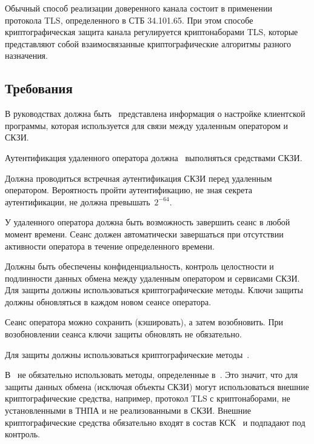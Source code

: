 Обычный способ реализации доверенного канала состоит в применении протокола 
TLS, определенного в СТБ 34.101.65. При этом способе криптографическая
защита канала регулируется криптонаборами TLS, которые представляют
собой взаимосвязанные криптографические алгоритмы разного назначения.

\subsection{Требования}\label{TC.Reqs}

\label{R.TC.GD}
В руководствах должна быть~
представлена информация о настройке клиентской программы, которая используется 
для связи между удаленным оператором и СКЗИ.

\label{R.TC.Auth}
Аутентификация удаленного оператора должна~ 
выполняться средствами СКЗИ.

\label{R.TC.Auth2}
Должна проводиться встречная аутентификация СКЗИ перед удаленным оператором.
Вероятность пройти аутентификацию, не зная секрета аутентификации, 
не должна превышать~$2^{-64}$.

\label{R.TC.Logout}
У удаленного оператора должна быть возможность завершить сеанс в любой момент 
времени. Сеанс должен автоматически завершаться при отсутствии активности 
оператора в течение определенного времени.

\label{R.TC.Crypto}
Должны быть обеспечены конфиденциальность, контроль целостности и подлинности 
данных обмена между удаленным оператором и сервисами СКЗИ.
%
Для защиты должны использоваться криптографические методы.
%
Ключи защиты должны обновляться в каждом новом сеансе оператора.

\begin{note}
Сеанс оператора можно сохранить (кэшировать), а затем возобновить.
При возобновлении сеанса ключи защиты обновлять не обязательно.
\end{note}

\label{R.TC.CryptoBY}
Для защиты должны использоваться криптографические 
методы~. 

\begin{note}
В~ не обязательно использовать методы,
определенные в~. Это значит, что для защиты 
данных обмена (исключая объекты СКЗИ) могут использоваться внешние 
криптографические средства, например, протокол TLS с криптонаборами, 
не установленными в ТНПА и не реализованными в СКЗИ. 
%
Внешние криптографические средства обязательно входят в состав 
КСК~ и подпадают под контроль.
\end{note}

